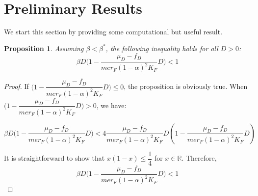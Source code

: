 \documentclass{article}
\newtheorem{prop}{Proposition}
\begin{document}
\section{Preliminary Results}

We start this section by providing some computational but useful result.

\begin{prop} \label{propBeta}
Assuming $\beta < \beta^*$, the following inequality holds for all $D > 0$:
$$
\beta D \Big(1 - \dfrac{\mu_D - f_D}{me r_F (1-\alpha)^2K_F } D\Big) < 1
$$
\end{prop}

\begin{proof}
If $\Big(1 - \dfrac{\mu_D - f_D}{me r_F (1-\alpha)^2K_F } D\Big) \leq 0$, the proposition is obviously true. When $\Big(1 - \dfrac{\mu_D - f_D}{me r_F (1-\alpha)^2K_F } D\Big) > 0$, we have:

\begin{equation*}
\beta D \Big(1 - \dfrac{\mu_D - f_D}{me r_F (1-\alpha)^2K_F } D\Big) < 4 \dfrac{\mu_D - f_D}{me r_F (1-\alpha)^2K_F } D \left(1 -\dfrac{\mu_D - f_D}{me r_F (1-\alpha)^2K_F } D \right)
\end{equation*}

It is straightforward to show that $x(1 - x) \leq \dfrac{1}{4}$ for $x \in \mathbb{R}$. Therefore,
$$
\beta D \Big(1 - \dfrac{\mu_D - f_D}{me r_F (1-\alpha)^2K_F } D\Big) < 1
$$
\end{proof}
\end{document}
